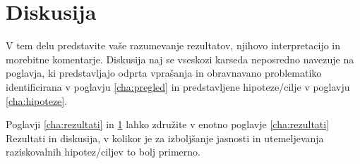 \chapter{Diskusija}\label{cha:diskusija}
V tem delu predstavite vaše razumevanje rezultatov, njihovo interpretacijo in morebitne komentarje. Diskusija naj se vseskozi karseda neposredno navezuje na poglavja, ki predstavljajo odprta vprašanja in obravnavano problematiko identificirana v poglavju \ref{cha:pregled} in predstavljene hipoteze/cilje v poglavju \ref{cha:hipoteze}.

Poglavji \ref{cha:rezultati} in \ref{cha:diskusija} lahko združite v enotno poglavje \ref{cha:rezultati} Rezultati in diskusija, v kolikor je za izboljšanje jasnosti in utemeljevanja raziskovalnih hipotez/ciljev to bolj primerno.
